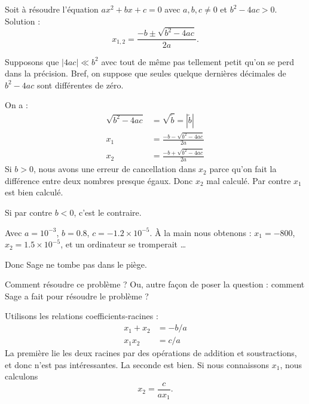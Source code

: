 \begin{example}
	Soit à résoudre l'équation \( ax^2+bx+c=0\) avec \( a,b,c\neq 0\) et \( b^2-4ac>0\). Solution :
	\begin{equation}
		x_{1,2}=\frac{ -b\pm\sqrt{b^2-4ac} }{ 2a }.
	\end{equation}

	Supposons que \( | 4ac |\ll b^2\) avec tout de même pas tellement petit qu'on se perd dans la précision. Bref, on suppose que seules quelque dernières décimales de \( b^2-4ac\) sont différentes de zéro.

	On a :
	\begin{subequations}
		\begin{align}
			\sqrt{b^2-4ac}&=\sqrt{\tilde b}= | \tilde b | \\
			x_1&=\frac{ -b-\sqrt{b^2-4ac} }{ 2a }\\
			x_2&=\frac{ -b+\sqrt{b^2-4ac} }{ 2a }
		\end{align}
	\end{subequations}
	Si \( b>0\), nous avons une erreur de cancellation dans \( x_2\) parce qu'on fait la différence entre deux nombres presque égaux. Donc \( x_2\) mal calculé. Par contre \( x_1\) est bien calculé.


	Si par contre \( b<0\), c'est le contraire.


	Avec \( a=10^{-3}\), \( b=0.8\), \( c=-1.2\times 10^{-5}\). À la main nous obtenons : \( x_1=-800\), \( x_2=1.5\times 10^{-5}\), et un ordinateur se tromperait \ldots




	Donc Sage ne tombe pas dans le piège.
\end{example}

Comment résoudre ce problème ? Ou, autre façon de poser la question : comment Sage a fait pour résoudre le problème ?

Utilisons les relations coefficients-racines :
\begin{subequations}
	\begin{align}
		x_1+x_2&=-b/a\\
		x_1x_2&=c/a
	\end{align}
\end{subequations}
La première lie les deux racines par des opérations de addition et soustractions, et donc n'est pas intéressantes. La seconde est bien. Si nous connaissons \( x_1\), nous calculons
\begin{equation}
	x_2=\frac{ c }{ ax_1 }.
\end{equation}

